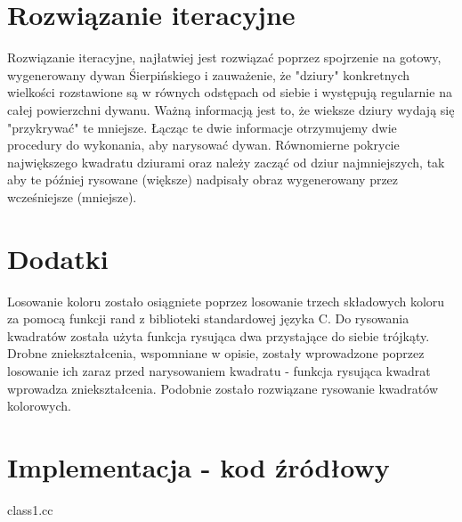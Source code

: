 \documentclass[polish,polish,a4paper]{report}
\begin{document}
\section{Rozwiązanie iteracyjne}
Rozwiązanie iteracyjne, najłatwiej jest rozwiązać poprzez spojrzenie na gotowy, wygenerowany dywan Śierpińskiego i zauważenie, że "dziury" konkretnych
wielkości rozstawione są w równych odstępach od siebie i występują regularnie na całej powierzchni dywanu. Ważną informacją jest to, że wieksze dziury
wydają się "przykrywać" te mniejsze. Łącząc te dwie informacje otrzymujemy dwie procedury do wykonania, aby narysować dywan. Równomierne pokrycie 
największego kwadratu dziurami oraz należy zacząć od dziur najmniejszych, tak aby te później rysowane (większe) nadpisały obraz wygenerowany przez
wcześniejsze (mniejsze).

\section{Dodatki}
Losowanie koloru zostało osiągniete poprzez losowanie trzech składowych koloru za pomocą funkcji rand z biblioteki standardowej języka C.
Do rysowania kwadratów została użyta funkcja rysująca dwa przystające do siebie trójkąty. Drobne zniekształcenia, wspomniane w opisie, zostały wprowadzone
poprzez losowanie ich zaraz przed narysowaniem kwadratu - funkcja rysująca kwadrat wprowadza zniekształcenia. Podobnie zostało rozwiązane rysowanie
kwadratów kolorowych.

\section{Implementacja - kod źródłowy}

{class1.cc}

\pagebreak
\end{document}
